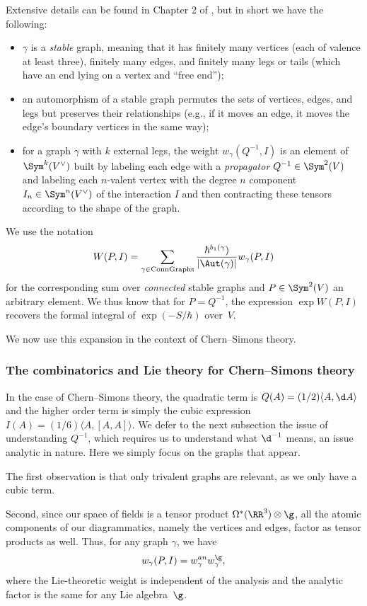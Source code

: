 \documentclass[10pt]{amsart}
\begin{document}
Extensive details can be found in Chapter 2 of \cite{CosBook},
but in short we have the following:
\begin{itemize}
\item $\gamma$ is a {\em stable} graph, meaning that it has finitely many vertices (each of valence at least three), finitely many edges, and finitely many legs or tails (which have an end lying on a vertex and ``free end'');
\item an automorphism of a stable graph permutes the sets of vertices, edges, and legs but preserves their relationships (e.g., if it moves an edge, it moves the edge's boundary vertices in the same way);
\item for a graph $\gamma$ with $k$ external legs, 
the weight $w_\gamma(Q^{-1},I)$ is an element of $\Sym^k(V^\vee)$ built by labeling each edge with a {\em propagator} $Q^{-1} \in \Sym^2(V)$ and labeling each $n$-valent vertex with the degree $n$ component $I_n \in \Sym^n(V^\vee)$ of the interaction $I$ and then contracting these tensors according to the shape of the graph.
\end{itemize}
We use the notation 
\[
W(P,I) = \sum_{\gamma \in {\rm ConnGraphs}} \frac{\hbar^{b_1(\gamma})}{|\Aut(\gamma)|} w_\gamma(P, I)
\]
for the corresponding sum over {\em connected} stable graphs 
and $P \in \Sym^2(V)$ an arbitrary element.
We thus know that for $P = Q^{-1}$, the expression $\exp W(P,I)$ recovers the formal integral of $\exp(-S/\hbar)$ over~$V$.

We now use this expansion in the context of Chern--Simons theory.

\subsubsection{The combinatorics and Lie theory for Chern--Simons theory}

In the case of Chern--Simons theory, 
the quadratic term is $Q(A) = (1/2)\langle A, \d A \rangle$ 
and the higher order term is simply the cubic expression $I(A) = (1/6)\langle A,[A,A]\rangle$.
We defer to the next subsection the issue of understanding $Q^{-1}$,
which requires us to understand what $\d^{-1}$ means, 
an issue analytic in nature.
Here we simply focus on the graphs that appear.

The first observation is that only trivalent graphs are relevant,
as we only have a cubic term.

Second, since our space of fields is a tensor product $\Omega^*(\RR^3) \otimes \g$,
all the atomic components of our diagrammatics, namely the vertices and edges, 
factor as tensor products as well.
Thus, for any graph $\gamma$, we have
\[
w_\gamma(P,I) = w_\gamma^{an} w_\gamma^{\g},
\]
where the Lie-theoretic weight is independent of the analysis
and the analytic factor is the same for any Lie algebra~$\g$.
\end{document}
